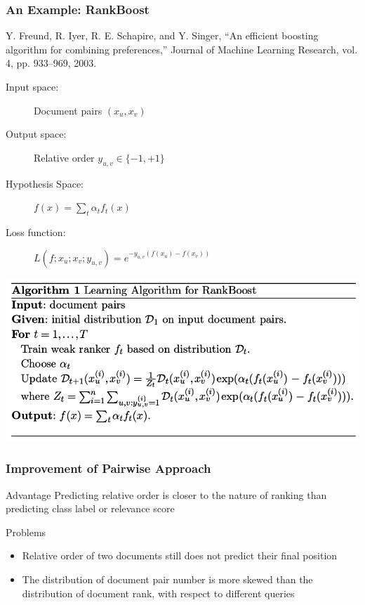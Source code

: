 \documentclass{beamer}
\begin{document}
\begin{frame}
    \frametitle{An Example: RankBoost}
    \begin{minipage}{1.0\linewidth}
        \footnotesize Y. Freund, R. Iyer, R. E. Schapire, and Y. Singer, ``An
        efficient boosting algorithm for combining preferences,'' Journal of
        Machine Learning Research, vol. 4, pp. 933--969, 2003.
    \end{minipage}
    \vfill
    \begin{description}
    \item[Input space:] Document pairs $(x_u,x_v)$
    \item[Output space:] Relative order $y_{u,v} \in \{-1,+1\}$
    \item[Hypothesis Space:] $f(x) = \sum_t\alpha_tf_t(x)$ 
    \item[Loss function:] $L(f; x_u; x_v; y_{u,v}) = e^{-y_{u,v}(f(x_u)-f(x_v))}$
    \end{description}
    \vfill
    \centering
    \includegraphics[width=\linewidth]{rankboost}

\end{frame}


\begin{frame}
    \frametitle{Improvement of Pairwise Approach}
    \begin{block}{Advantage}
        Predicting relative order is closer to the nature of ranking than
        predicting class label or relevance score
    \end{block}
    \begin{block}{Problems}
        \begin{itemize}
        \item Relative order of two documents still does not predict their
            final position
        \item The distribution of document pair number is more skewed than the
            distribution of document rank, with respect to different queries
        \end{itemize}
    \end{block}
\end{frame}
\end{document}
